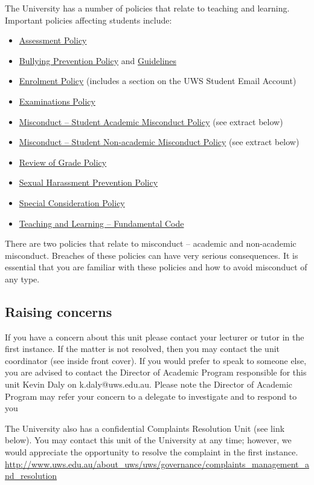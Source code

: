 \documentclass{uws_learning_guide}
\begin{document}
The University has a number of policies that relate to teaching and learning. Important policies affecting students include: 
\begin{itemize}
\item \href{http://policies.uws.edu.au/view.current.php?id=00227}{Assessment Policy}
\item \href{http://policies.uws.edu.au/view.current.php?id=00099}{Bullying Prevention Policy} and \href{http://policies.uws.edu.au/view.current.php?id=00240}{Guidelines}
\item \href{http://policies.uws.edu.au/view.current.php?id=00019}{Enrolment Policy} (includes a section on the UWS Student Email Account) 
\item \href{http://policies.uws.edu.au/view.current.php?id=00204}{Examinations Policy}
\item \href{http://policies.uws.edu.au/view.current.php?id=00051}{Misconduct -- Student Academic Misconduct Policy} (see extract below) 
\item \href{http://policies.uws.edu.au/view.current.php?id=00104}{Misconduct -- Student Non-academic Misconduct Policy} (see extract below) 
\item \href{http://policies.uws.edu.au/view.current.php?id=00203}{Review of Grade Policy}
\item \href{http://policies.uws.edu.au/view.current.php?id=00103}{Sexual Harassment Prevention Policy}
\item \href{http://policies.uws.edu.au/view.current.php?id=00205}{Special Consideration Policy}
\item \href{http://policies.uws.edu.au/view.current.php?id=00139}{Teaching and Learning -- Fundamental Code}
\end{itemize}

There are two policies that relate to misconduct -- academic and
non-academic misconduct. Breaches of these policies can have very
serious consequences. It is essential that you are familiar with these
policies and how to avoid misconduct of any type.

\subsection{Raising concerns}

If you have a concern about this unit please contact your lecturer or
tutor in the first instance. If the matter is not resolved, then you
may contact the unit coordinator (see inside front cover). If you
would prefer to speak to someone else, you are advised to contact the
Director of Academic Program responsible for this unit Kevin Daly on
k.daly@uws.edu.au. Please note the Director of Academic Program may
refer your concern to a delegate to investigate and to respond to you

The University also has a confidential Complaints Resolution Unit (see
link below). You may contact this unit of the University at any time;
however, we would appreciate the opportunity to resolve the complaint
in the first
instance. \url{http://www.uws.edu.au/about_uws/uws/governance/complaints_management_and_resolution}
\end{document}
